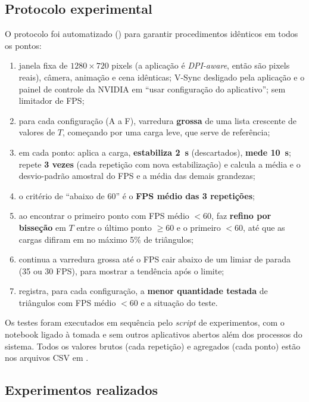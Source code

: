 \documentclass[12pt,a4paper]{article}
\newcommand{\code}[1]{\texttt{\detokenize{#1}}}
\begin{document}
\subsection{Protocolo experimental}

O protocolo foi automatizado (\code{benchmark.cpp}) para garantir procedimentos idênticos em todos
os pontos:
\begin{enumerate}
  \item janela fixa de $1280\times720$ pixels (a aplicação é \emph{DPI-aware}, então são pixels
        reais), câmera, animação e cena idênticas; V-Sync desligado pela aplicação e o painel de
        controle da NVIDIA em ``usar configuração do aplicativo''; sem limitador de FPS;
  \item para cada configuração (A a F), varredura \textbf{grossa} de uma lista crescente de valores
        de $T$, começando por uma carga leve, que serve de referência;
  \item em cada ponto: aplica a carga, \textbf{estabiliza 2~s} (descartados), \textbf{mede 10~s};
        repete \textbf{3 vezes} (cada repetição com nova estabilização) e calcula a média e o
        desvio-padrão amostral do FPS e a média das demais grandezas;
  \item o critério de ``abaixo de 60'' é o \textbf{FPS médio das 3 repetições};
  \item ao encontrar o primeiro ponto com FPS médio $<60$, faz \textbf{refino por bisseção} em $T$
        entre o último ponto $\geq 60$ e o primeiro $<60$, até que as cargas difiram em no máximo
        5\% de triângulos;
  \item continua a varredura grossa até o FPS cair abaixo de um limiar de parada (35 ou 30 FPS),
        para mostrar a tendência após o limite;
  \item registra, para cada configuração, a \textbf{menor quantidade testada} de triângulos com FPS
        médio $<60$ e a situação do teste.
\end{enumerate}
Os testes foram executados em sequência pelo \emph{script} de experimentos, com o notebook ligado à tomada e sem outros aplicativos abertos além dos processos do sistema.
Todos os valores brutos (cada repetição) e agregados (cada ponto) estão nos arquivos CSV em
\code{resultados/dados}.

\subsection{Experimentos realizados}
\end{document}
